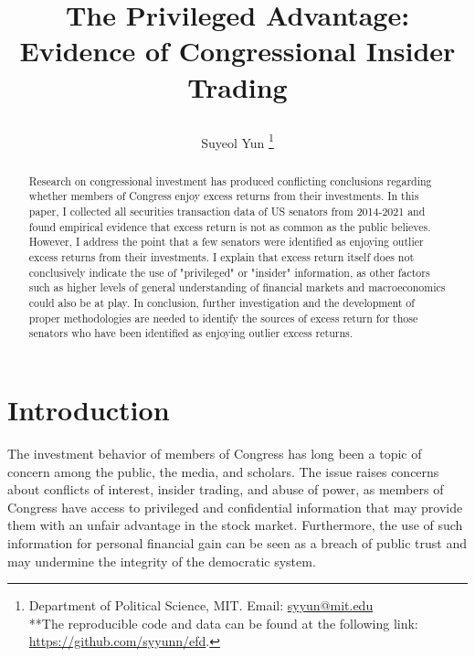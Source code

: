 \documentclass[12pt,letterpaper]{article}
\newcommand{\tit}{
\bf 
The Privileged Advantage: Evidence of Congressional Insider Trading
}
\newcommand\spacingset[1]{\renewcommand{\baselinestretch}
{#1}\small\normalsize}
\begin{document}
\spacingset{1.25}

\setcounter{page}{0}
\vspace{-.1in}

{\title{
    \tit
  }
  \author{
    Suyeol Yun
  \thanks{Department of Political Science, MIT. Email: \href{mailto:syyun@mit.edu}{syyun@mit.edu}\\
  **The reproducible code and data can be found at the following link: \href{https://github.com/syyunn/efd}{https://github.com/syyunn/efd}.
  }
  }
  \maketitle
}

\thispagestyle{empty}
\vspace{-.1in}

\begin{abstract}
  Research on congressional investment has produced conflicting conclusions regarding whether members of Congress enjoy excess returns from their investments. In this paper, I collected all securities transaction data of US senators from 2014-2021 and found empirical evidence that excess return is not as common as the public believes. However, I address the point that a few senators were identified as enjoying outlier excess returns from their investments. I explain that excess return itself does not conclusively indicate the use of "privileged" or "insider" information, as other factors such as higher levels of general understanding of financial markets and macroeconomics could also be at play. In conclusion, further investigation and the development of proper methodologies are needed to identify the sources of excess return for those senators who have been identified as enjoying outlier excess returns. 
\spacingset{1.5} %
\end{abstract}
\clearpage

\section{Introduction}
\spacingset{2} %

The investment behavior of members of Congress has long been a topic of concern among the public, the media, and scholars. The issue raises concerns about conflicts of interest, insider trading, and abuse of power, as members of Congress have access to privileged and confidential information that may provide them with an unfair advantage in the stock market. Furthermore, the use of such information for personal financial gain can be seen as a breach of public trust and may undermine the integrity of the democratic system.
\end{document}
